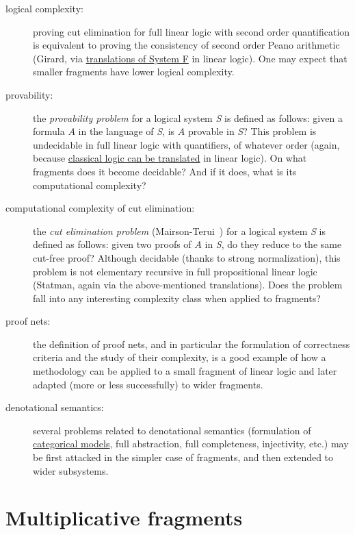 \begin{description}
\item[logical complexity:] proving cut elimination for full linear
  logic with second order quantification is equivalent to proving the
  consistency of second order Peano arithmetic (Girard, via
  \hyperref[translations-of-intuitionistic-logic]{translations of System F}
  in linear logic). One may expect that smaller fragments have lower
  logical complexity.
\item[provability:] the \emph{provability problem} for a logical
  system \emph{S} is defined as follows: given a formula \(A\) in the
  language of \emph{S}, is \(A\) provable in \emph{S}? This problem is
  undecidable in full linear logic with quantifiers, of whatever order
  (again, because \hyperref[translations-of-classical-logic]{classical logic
  can be translated} in linear logic). On what fragments does it become
  decidable? And if it does, what is its computational complexity?
\item[computational complexity of cut elimination:] the \emph{cut
  elimination problem} (Mairson-Terui~\cite{cutelimcomplexity}) for a logical system \emph{S} is
  defined as follows: given two proofs of \(A\) in \emph{S}, do they
  reduce to the same cut-free proof? Although decidable (thanks to
  strong normalization), this problem is not elementary recursive in
  full propositional linear logic (Statman, again via the
  above-mentioned translations). Does the problem fall into any
  interesting complexity class when applied to fragments?
\item[proof nets:] the definition of proof nets, and in particular
  the formulation of correctness criteria and the study of their
  complexity, is a good example of how a methodology can be applied to a
  small fragment of linear logic and later adapted (more or less
  successfully) to wider fragments.
\item[denotational semantics:] several problems related to
  denotational semantics (formulation of
  \hyperref[categorical-semantics]{categorical models}, full abstraction,
  full completeness, injectivity, etc.) may be first attacked in the
  simpler case of fragments, and then extended to wider subsystems.
\end{description}

\section{Multiplicative fragments}\label{multiplicative-fragments}

